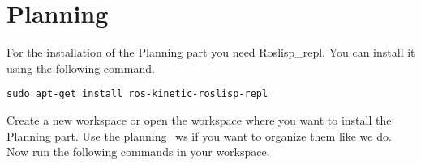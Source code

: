 \documentclass[main.tex]{subfiles}
\begin{document}
	\section{Planning}
	\label{sec:Planning}
	For the installation of the Planning part you need Roslisp\_repl.
	You can install it using the following command.\\
	\begin{lstlisting}
sudo apt-get install ros-kinetic-roslisp-repl 
\end{lstlisting}

	Create a new workspace or open the workspace where you want to install the Planning part. Use the planning\_ws if you want to organize them like we do. Now run the following commands in your workspace.\\
\begin{mdframed}[backgroundcolor=mygray, rightline=false]

\end{mdframed}
	
	
\end{document}
